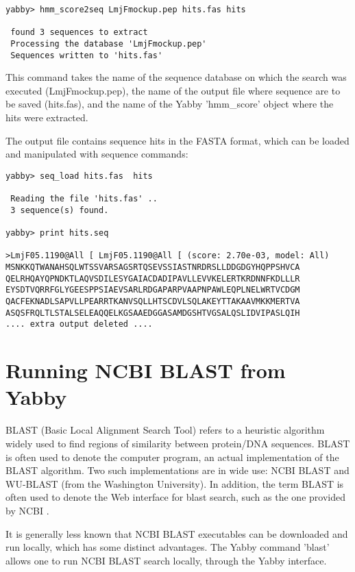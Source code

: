 \begin{verbatim}
yabby> hmm_score2seq LmjFmockup.pep hits.fas hits

 found 3 sequences to extract
 Processing the database 'LmjFmockup.pep'
 Sequences written to 'hits.fas'
\end{verbatim}

This command takes the name of the sequence database on
which the search was executed (LmjFmockup.pep), the name
of the output file where sequence are to be saved (hits.fas),
and the name of the Yabby 'hmm\_score' object where the
hits were extracted.

The output file contains sequence hits in the FASTA format,
which can be loaded and manipulated with sequence commands: 

\begin{verbatim}
yabby> seq_load hits.fas  hits

 Reading the file 'hits.fas' ..
 3 sequence(s) found.

yabby> print hits.seq

>LmjF05.1190@All [ LmjF05.1190@All [ (score: 2.70e-03, model: All)
MSNKKQTWANAHSQLWTSSVARSAGSRTQSEVSSIASTNRDRSLLDDGDGYHQPPSHVCA
QELRHQAYQPNDKTLAQVSDILESYGAIACDADIPAVLLEVVKELERTKRDNNFKDLLLR
EYSDTVQRRFGLYGEESPPSIAEVSARLRDGAPARPVAAPNPAWLEQPLNELWRTVCDGM
QACFEKNADLSAPVLLPEARRTKANVSQLLHTSCDVLSQLAKEYTTAKAAVMKKMERTVA
ASQSFRQLTLSTALSELEAQQELKGSAAEDGGASAMDGSHTVGSALQSLIDVIPASLQIH
.... extra output deleted ....
\end{verbatim}


\section{Running NCBI BLAST from Yabby}

BLAST (Basic Local Alignment Search Tool) refers to a heuristic
algorithm widely used to find regions of similarity between
protein/DNA sequences. BLAST is often used to denote the computer
program, an actual implementation of the BLAST algorithm. Two
such implementations are in wide use: NCBI BLAST and WU-BLAST
(from the Washington University). In addition, the term BLAST
is often used to denote the Web interface for blast search,
such as the one provided by NCBI \cite{wwwblast}.

It is generally less known that NCBI BLAST executables can be
downloaded \cite{ftpblast} and run locally, which has some
distinct advantages. The Yabby command 'blast' allows one to
run NCBI BLAST search locally, through the Yabby interface. 

